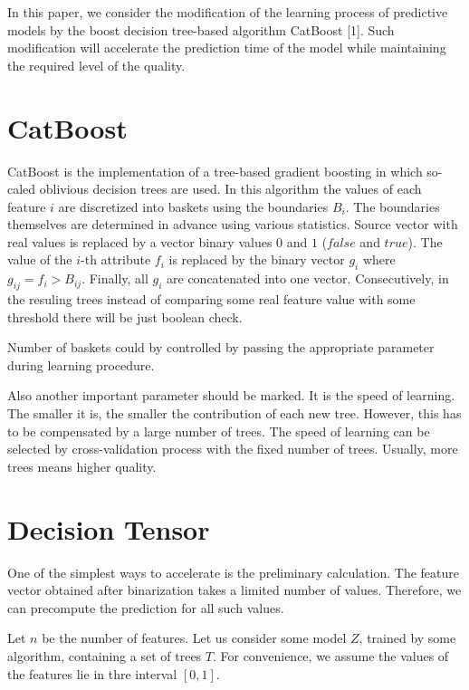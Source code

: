 \documentclass[a4paper]{jpconf}
\begin{document}
In this paper, we consider the modification of the learning process of predictive models by the boost decision tree-based algorithm CatBoost [1]. Such modification will accelerate the prediction time of the model while maintaining the required level of the quality.

\section{CatBoost}

CatBoost is the implementation of a tree-based gradient boosting in which so-caled oblivious decision trees are used. In this algorithm the values of each feature $i$ are discretized into baskets using the boundaries $B_i$. The boundaries themselves are determined in advance using various statistics.
Source vector with real values is replaced by a vector binary values $0$ and $1$ ($false$ and $true$). The value of the $i$-th attribute $f_i$ is replaced by the binary vector $g_i$ where $g_{ij} = f_i > B_{ij}$. Finally, all $g_i$ are concatenated into one vector. Consecutively, in the resuling trees instead of comparing some real feature value with some threshold there will be just boolean check.

Number of baskets could by controlled by passing the appropriate parameter during learning procedure.

Also another important parameter should be marked. It is the speed of learning. The smaller it is, the smaller the contribution of each new tree. However, this has to be compensated by a large number of trees. The speed of learning can be selected by cross-validation process with the fixed number of trees.
Usually, more trees means higher quality.

\section{Decision Tensor}
One of the simplest ways to accelerate is the preliminary calculation. The feature vector obtained after binarization takes a limited number of values. Therefore, we can precompute the prediction for all such values.

Let $n$ be the number of features. Let us consider some model $Z$, trained by some algorithm, containing a set of trees $T$. For convenience, we assume the values of the features lie in thre interval $[0, 1]$.
\end{document}
